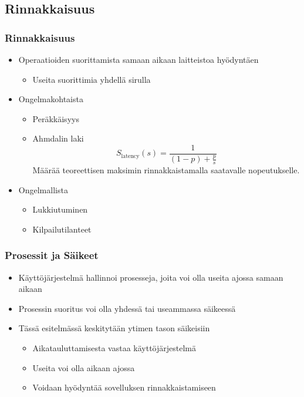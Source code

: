 \documentclass{beamer}
\begin{document}
\subsection{Rinnakkaisuus}
\begin{frame}
  \frametitle{Rinnakkaisuus}
  \begin{itemize}
    \item Operaatioiden suorittamista samaan aikaan laitteistoa hyödyntäen
      \begin{itemize}
        \item Useita suorittimia yhdellä sirulla
      \end{itemize}
    \item Ongelmakohtaista
      \begin{itemize}
        \item Peräkkäisyys
        \item Ahmdalin laki \\
          \[ S_{\text{latency}}(s) =  \frac{1}{(1-p) + \frac{p}{s}} \]
          Määrää teoreettisen maksimin rinnakkaistamalla
          saatavalle nopeutukselle.
      \end{itemize}
    \item Ongelmallista
      \begin{itemize}
        \item Lukkiutuminen
        \item Kilpailutilanteet
      \end{itemize}
  \end{itemize}
\end{frame}

\begin{frame}
  \frametitle{Prosessit ja Säikeet}
  \begin{itemize}
    \item Käyttöjärjestelmä hallinnoi prosesseja, joita
      voi olla useita ajossa samaan aikaan
    \item Prosessin suoritus voi olla yhdessä tai useammassa säikeessä
    \item Tässä esitelmässä keskitytään ytimen tason säikeisiin
      \begin{itemize}
        \item Aikatauluttamisesta vastaa käyttöjärjestelmä
        \item Useita voi olla aikaan ajossa
        \item Voidaan hyödyntää sovelluksen rinnakkaistamiseen
      \end{itemize}
  \end{itemize}

\end{frame}
\end{document}
